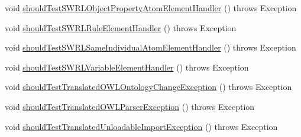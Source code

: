 \begin{DoxyCompactItemize}
void \hyperlink{classorg_1_1semanticweb_1_1owlapi_1_1contract_1_1_contract_owlxmlparser_test_ab90c4be65d670e372260728803c2909e}{should\-Test\-S\-W\-R\-L\-Object\-Property\-Atom\-Element\-Handler} ()  throws Exception 
\item 
void \hyperlink{classorg_1_1semanticweb_1_1owlapi_1_1contract_1_1_contract_owlxmlparser_test_ad7aeb0b6cd082af453804fd30e9c949a}{should\-Test\-S\-W\-R\-L\-Rule\-Element\-Handler} ()  throws Exception 
\item 
void \hyperlink{classorg_1_1semanticweb_1_1owlapi_1_1contract_1_1_contract_owlxmlparser_test_abd44b8ffe0c80f13ef2e7c965250fa8b}{should\-Test\-S\-W\-R\-L\-Same\-Individual\-Atom\-Element\-Handler} ()  throws Exception 
\item 
void \hyperlink{classorg_1_1semanticweb_1_1owlapi_1_1contract_1_1_contract_owlxmlparser_test_a32e8d318176d9c099c37238399d14720}{should\-Test\-S\-W\-R\-L\-Variable\-Element\-Handler} ()  throws Exception 
\item 
void \hyperlink{classorg_1_1semanticweb_1_1owlapi_1_1contract_1_1_contract_owlxmlparser_test_aa3b91ce4eb71eadf15ebf7fb60c7a001}{should\-Test\-Translated\-O\-W\-L\-Ontology\-Change\-Exception} ()  throws Exception 
\item 
void \hyperlink{classorg_1_1semanticweb_1_1owlapi_1_1contract_1_1_contract_owlxmlparser_test_a25e14f1d4117439544125e3e3db90228}{should\-Test\-Translated\-O\-W\-L\-Parser\-Exception} ()  throws Exception 
\item 
void \hyperlink{classorg_1_1semanticweb_1_1owlapi_1_1contract_1_1_contract_owlxmlparser_test_a6af717b359f6aa71dabe47781b2c694e}{should\-Test\-Translated\-Unloadable\-Import\-Exception} ()  throws Exception 
\end{DoxyCompactItemize}


